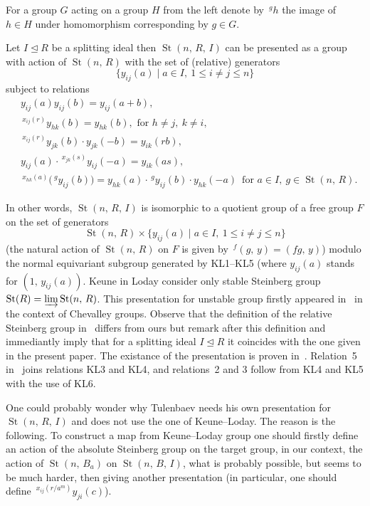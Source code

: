 \documentclass[11pt]{amsart}
\theoremstyle{plain} \declaretheorem[name=Theorem, Refname={Theorem,Theorems}]{tm} \Crefname{tm}{Theorem}{Theorems}
\numberwithin{equation}{section}
\theoremstyle{definition} \newtheorem{df}[lm]{Definition} \Crefname{df}{Definition}{Definitions}
\theoremstyle{remark} \newtheorem{rk}[lm]{Remark} \Crefname{rk}{Remark}{Remarks}
\newcommand{\St}{\mathop{\mathrm{St}}\nolimits}
\begin{document}
For a group $G$ acting on a group $H$ from the left denote by $\!\,^gh$ the image of $h\in H$ under homomorphism corresponding by $g\in G$.

Let $I\trianglelefteq R$ be a splitting ideal then $\St(n,\,R,\,I)$ can be presented as a group with action of $\St(n,\,R)$ with the set of (relative) generators
$$
\{y_{ij}(a)\mid a\in I,\ 1\leq i\neq j\leq n\}
$$
subject to relations
\setcounter{equation}{0}
\renewcommand{\theequation}{KL\arabic{equation}}
\begin{align}
&y_{ij}(a)y_{ij}(b)=y_{ij}(a+b),\\
&\!\,^{x_{ij}(r)}y_{hk}(b)=y_{hk}(b),\text{ for }h\neq j,\ k\neq i,\\
&\!\,^{x_{ij}(r)}y_{jk}(b)\cdot y_{jk}(-b)=y_{ik}(rb),\\
&y_{ij}(a)\cdot\,^{x_{jk}(s)}y_{ij}(-a)=y_{ik}(as),\\
&\!\,^{x_{hk}(a)}\big(\!\,^gy_{ij}(b)\big)=y_{hk}(a)\cdot\,^gy_{ij}(b)\cdot y_{hk}(-a)\,\text{ for }a\in I,\ g\in\St(n,\,R).
\end{align}

In other words, $\St(n,\,R,\,I)$ is isomorphic to a quotient group of a free group $F$ on the set of generators 
$$\St(n,\,R)\times\{y_{ij}(a)\mid a\in I,\ 1\leq i\neq j\leq n\}$$
(the natural action of $\St(n,\,R)$ on $F$ is given by $\!\,^f(g,\,y)=(fg,\,y)$) modulo the normal equivariant subgroup generated by KL1--KL5 (where $y_{ij}(a)$ stands for $(1,\,y_{ij}(a))$. Keune in Loday consider only stable Steinberg group $\St(R)=\varinjlim\St(n,\,R)$. This presentation for unstable group firstly appeared in~\cite{SCh} in the context of Chevalley groups. Observe that the definition of the relative Steinberg group in~\cite[Def.~3.3]{SCh} differs from ours but remark after this definition and~\cite[Lem.~8]{SCh} immediantly imply that for a splitting ideal $I\trianglelefteq R$ it coincides with the one given in the present paper. The existance of the presentation is proven in~\cite[Prop.~6]{SCh}. Relation~5 in~\cite[Prop.~6]{SCh} joins relations KL3 and KL4, and relations~2 and 3 follow from KL4 and KL5 with the use of KL6.

One could probably wonder why Tulenbaev needs his own presentation for $\St(n,\,R,\,I)$ and does not use the one of Keune--Loday. The reason is the following. To construct a map from Keune--Loday group one should firstly define an action of the absolute Steinberg group on the target group, in our context, the action of $\St(n,\,B_a)$ on $\St(n,\,B,\,I)$, what is probably possible, but seems to be much harder, then giving another presentation (in particular, one should define $\!\,^{x_{ij}(r/a^m)}y_{ji}(c)$).
\end{document}
